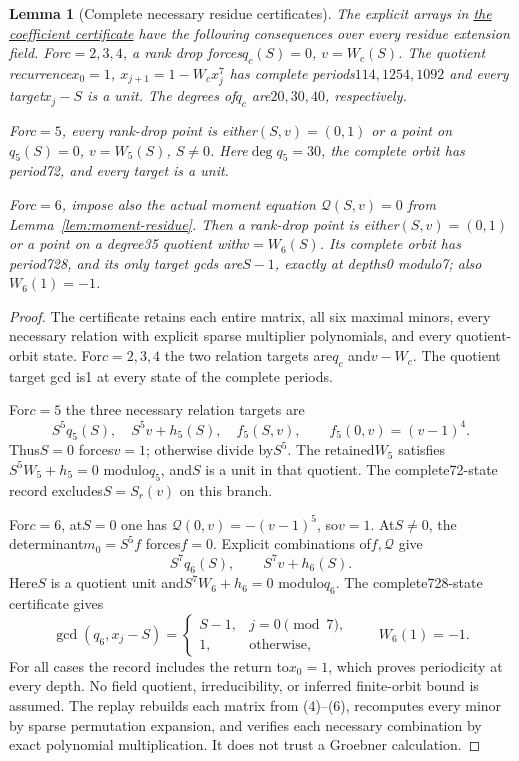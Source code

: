 \documentclass[11pt]{article}
\newtheorem{lemma}{Lemma}\newtheorem{theorem}[lemma]{Theorem}
\begin{document}
\begin{lemma}[Complete necessary residue certificates]\label{lem:certificates}
The explicit arrays in
\href{gap_six_two_digit_leading_two_certificate.json}{the coefficient certificate}
have the following consequences over every residue extension field.
For$c=2,3,4$, a rank drop forces$q_c(S)=0$, $v=W_c(S)$.
The quotient recurrence$x_0=1$, $x_{j+1}=1-W_cx_j^7$ has complete
periods$114,1254,1092$ and every target$x_j-S$ is a unit.
The degrees of$q_c$ are$20,30,40$, respectively.

For$c=5$, every rank-drop point is either$(S,v)=(0,1)$ or a
point on$q_5(S)=0$, $v=W_5(S)$, $S\ne0$.
Here$\deg q_5=30$, the complete orbit has period72, and every
target is a unit.

For$c=6$, impose also the actual moment equation
$\mathcal Q(S,v)=0$ from Lemma~\ref{lem:moment-residue}.
Then a rank-drop point is either$(S,v)=(0,1)$ or a point on a
degree35 quotient with$v=W_6(S)$.
Its complete orbit has period728, and its only target gcds
are$S-1$, exactly at depths0 modulo7; also$W_6(1)=-1$.
\end{lemma}
\begin{proof}
The certificate retains each entire matrix, all six maximal minors,
every necessary relation with explicit sparse multiplier polynomials,
and every quotient-orbit state.
For$c=2,3,4$ the two relation targets are$q_c$ and$v-W_c$.
The quotient target gcd is1 at every state of the complete periods.

For$c=5$ the three necessary relation targets are
\[
 S^5q_5(S),\quad S^5v+h_5(S),\quad f_5(S,v),
                    \qquad f_5(0,v)=(v-1)^4.
\]
Thus$S=0$ forces$v=1$; otherwise divide by$S^5$.
The retained$W_5$ satisfies$S^5W_5+h_5=0$ modulo$q_5$,
and$S$ is a unit in that quotient.
The complete72-state record excludes$S=S_r(v)$ on this branch.

For$c=6$, at$S=0$ one has
$\mathcal Q(0,v)=-(v-1)^5$, so$v=1$.
At$S\ne0$, the determinant$m_0=S^5f$ forces$f=0$.
Explicit combinations of$f,\mathcal Q$ give
\[
 S^7q_6(S),\qquad S^7v+h_6(S).
\]
Here$S$ is a quotient unit and$S^7W_6+h_6=0$ modulo$q_6$.
The complete728-state certificate gives
\[
 \gcd(q_6,x_j-S)=
 \begin{cases}S-1,&j=0\pmod7,\\1,&\text{otherwise},\end{cases}
 \qquad W_6(1)=-1.
\]
For all cases the record includes the return to$x_0=1$,
which proves periodicity at every depth.
No field quotient, irreducibility, or inferred finite-orbit bound
is assumed.
The replay rebuilds each matrix from (4)--(6), recomputes every
minor by sparse permutation expansion, and verifies each
necessary combination by exact polynomial multiplication.
It does not trust a Groebner calculation.
\end{proof}
\end{document}
